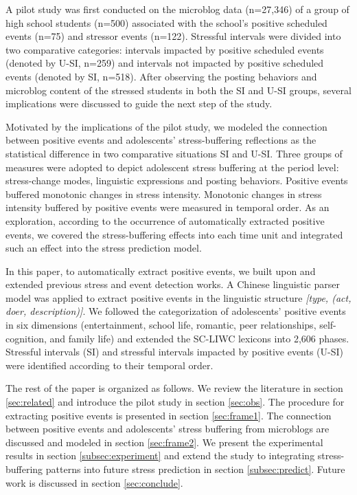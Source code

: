 \documentclass[5p,times,numbers,authoryear]{elsarticle}
\begin{document}
A pilot study was first conducted on the microblog data (n=27,346) of a group of high school students (n=500) associated with the school's positive scheduled events (n=75) and stressor events (n=122).
Stressful intervals were divided into two comparative categories:
intervals impacted by positive scheduled events (denoted by U-SI, n=259)
and intervals not impacted by positive scheduled events (denoted by SI, n=518).
After observing the posting behaviors and microblog content of the stressed students in both the SI and U-SI groups, several implications were discussed to guide the next step of the study.

Motivated by the implications of the pilot study, we modeled the connection between positive events and adolescents' stress-buffering reflections as the statistical difference in two comparative situations SI and U-SI.
Three groups of measures were adopted to depict adolescent stress buffering at the period level:
stress-change modes, linguistic expressions and posting behaviors.
Positive events buffered monotonic changes in stress intensity.
Monotonic changes in stress intensity buffered by positive events were measured in temporal order.
As an exploration, according to the occurrence of automatically extracted positive events,
we covered the stress-buffering effects into each time unit and integrated such an effect into the stress prediction model.

In this paper, to automatically extract positive events, we built upon and extended previous stress and event detection works. A Chinese linguistic parser model was applied to extract positive events in the linguistic structure
\emph{[type, (act, doer, description)]}.
We followed the categorization of adolescents' positive events in six dimensions (entertainment, school life, romantic, peer relationships, self-cognition, and family life) and extended the
SC-LIWC
lexicons into 2,606 phases.
Stressful intervals (SI) and stressful intervals impacted by positive events (U-SI) were identified according to their temporal order.

The rest of the paper is organized as follows.
We review the literature in section \ref{sec:related} and introduce the pilot study in section \ref{sec:obs}.
The procedure for extracting positive events is presented in section \ref{sec:frame1}.
The connection between positive events and adolescents' stress buffering from microblogs are discussed and modeled in section \ref{sec:frame2}.
We present the experimental results in section \ref{subsec:experiment}
and extend the study to integrating stress-buffering patterns into future stress prediction in section \ref{subsec:predict}.
Future work is discussed in section \ref{sec:conclude}.
\end{document}
